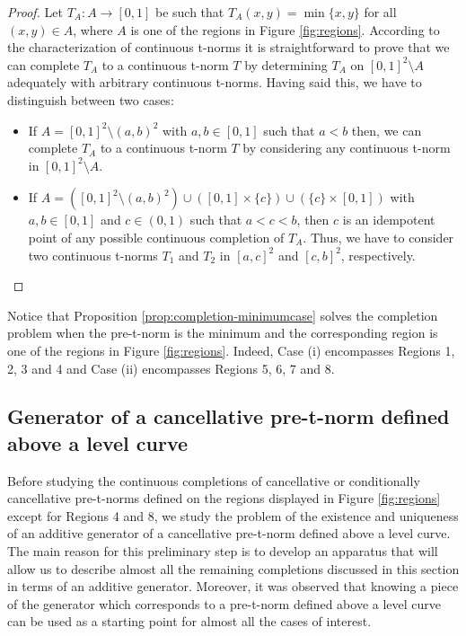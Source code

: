 \begin{proof} Let $T_A:A \to [0,1]$ be such that $T_A(x,y)=\min\{x,y\}$ for all $(x,y) \in A$, where $A$ is one of the regions in Figure \ref{fig:regions}. According to the characterization of continuous t-norms it is straightforward to prove that we can complete $T_A$ to a continuous t-norm $T$ by determining $T_A$ on $[0,1]^2 \setminus A$ adequately with arbitrary continuous t-norms. Having said this, we have to distinguish between two cases:
	\begin{itemize}
		\item  If $A=[0,1]^2 \setminus (a,b)^2$ with $a,b \in [0,1]$ such that $a<b$ then, we can complete $T_A$ to a continuous t-norm $T$ by considering any continuous t-norm in $[0,1]^2 \setminus A$.
		\item If $A=([0,1]^2 \setminus (a,b)^2) \cup ([0,1]\times \{c\}) \cup (\{c\}\times [0,1])$ with $a,b \in [0,1]$ and $c \in (0,1)$ such that $a<c<b$, then $c$ is an idempotent point of any possible continuous completion of $T_A$. Thus, we have to consider two continuous t-norms $T_1$ and $T_2$ in $[a,c]^2$ and $[c,b]^2$, respectively.
	\end{itemize}
\end{proof}

\begin{remark}
	Notice that Proposition \ref{prop:completion-minimumcase} solves the completion problem when the pre-t-norm is the minimum and the corresponding region is one of the regions in  Figure \ref{fig:regions}. Indeed, Case (i) encompasses Regions 1, 2, 3 and 4 and Case (ii) encompasses Regions 5, 6, 7 and 8.
\end{remark}

\subsection{Generator of a cancellative pre-t-norm defined above a level curve}

Before studying the continuous completions of cancellative or conditionally cancellative pre-t-norms defined on the regions displayed in Figure \ref{fig:regions} except for Regions 4 and 8, we study the problem of the existence and uniqueness of an additive generator of a cancellative pre-t-norm defined above a level curve. The main reason for this preliminary step is to develop an apparatus that will allow us to describe almost all the remaining completions discussed in this section in terms of an additive generator. Moreover, it was observed that knowing a piece of the generator which corresponds to a pre-t-norm defined above a level curve can be used as a starting point for almost all the cases of interest.

